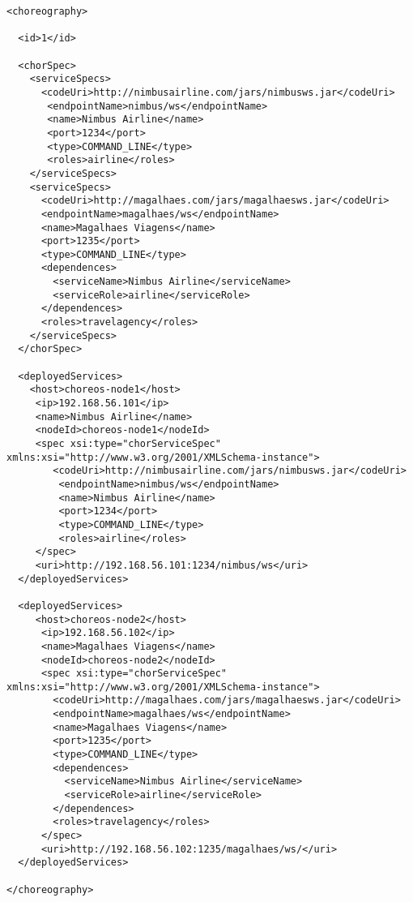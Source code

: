 {\footnotesize
\begin{lstlisting}[frame=trbl, label=lst:chor_xml, caption=Exemplo de representação XML da classe \textsf{Choreography}]
<choreography>

  <id>1</id>

  <chorSpec>
    <serviceSpecs>
      <codeUri>http://nimbusairline.com/jars/nimbusws.jar</codeUri>
       <endpointName>nimbus/ws</endpointName>
       <name>Nimbus Airline</name>
       <port>1234</port>
       <type>COMMAND_LINE</type>
       <roles>airline</roles>
    </serviceSpecs>  
    <serviceSpecs>
      <codeUri>http://magalhaes.com/jars/magalhaesws.jar</codeUri>
      <endpointName>magalhaes/ws</endpointName>
      <name>Magalhaes Viagens</name>
      <port>1235</port>
      <type>COMMAND_LINE</type>
      <dependences>
        <serviceName>Nimbus Airline</serviceName>
        <serviceRole>airline</serviceRole>
      </dependences>
      <roles>travelagency</roles>
    </serviceSpecs>  
  </chorSpec>
  
  <deployedServices>
    <host>choreos-node1</host>
     <ip>192.168.56.101</ip>
     <name>Nimbus Airline</name>
     <nodeId>choreos-node1</nodeId>
     <spec xsi:type="chorServiceSpec" xmlns:xsi="http://www.w3.org/2001/XMLSchema-instance">
        <codeUri>http://nimbusairline.com/jars/nimbusws.jar</codeUri>
         <endpointName>nimbus/ws</endpointName>
         <name>Nimbus Airline</name>
         <port>1234</port>
         <type>COMMAND_LINE</type>
         <roles>airline</roles>
     </spec>
     <uri>http://192.168.56.101:1234/nimbus/ws</uri>
  </deployedServices>
  
  <deployedServices>
     <host>choreos-node2</host>
      <ip>192.168.56.102</ip>
      <name>Magalhaes Viagens</name>
      <nodeId>choreos-node2</nodeId>
      <spec xsi:type="chorServiceSpec" xmlns:xsi="http://www.w3.org/2001/XMLSchema-instance">
        <codeUri>http://magalhaes.com/jars/magalhaesws.jar</codeUri>
        <endpointName>magalhaes/ws</endpointName>
        <name>Magalhaes Viagens</name>
        <port>1235</port>
        <type>COMMAND_LINE</type>
        <dependences>
          <serviceName>Nimbus Airline</serviceName>
          <serviceRole>airline</serviceRole>
        </dependences>
        <roles>travelagency</roles>
      </spec>
      <uri>http://192.168.56.102:1235/magalhaes/ws/</uri>
  </deployedServices>

</choreography>

\end{lstlisting}

}

